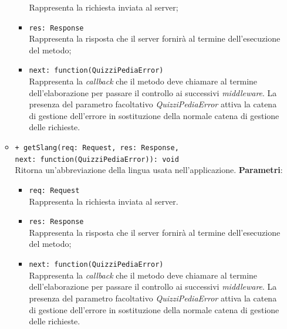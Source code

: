 \begin{itemize}
\begin{itemize}
\begin{itemize}
					Rappresenta la richiesta inviata al server;
					\item \texttt{res: Response} \\
					Rappresenta la risposta che il server fornirà al termine  dell'esecuzione del metodo;
					\item \texttt{next: function(QuizziPediaError)} \\
					Rappresenta la \textit{callback} che il metodo deve chiamare al termine dell'elaborazione per passare il controllo ai successivi \textit{middleware}. La presenza del parametro facoltativo \textit{QuizziPediaError} attiva la catena di gestione dell'errore in sostituzione della normale catena di gestione delle richieste.
				\end{itemize}
				\item \texttt{+ getSlang(req: Request, res: Response,\\ next: function(QuizziPediaError)): void} \\
				Ritorna un'abbreviazione della lingua usata nell'applicazione.
			\textbf{Parametri}:
				\begin{itemize}
					\item \texttt{req: Request} \\
					Rappresenta la richiesta inviata al server.
					\item \texttt{res: Response} \\
					Rappresenta la risposta che il server fornirà al termine  dell'esecuzione del metodo;
					\item \texttt{next: function(QuizziPediaError)} \\
					Rappresenta la \textit{callback} che il metodo deve chiamare al termine dell'elaborazione per passare il controllo ai successivi \textit{middleware}. La presenza del parametro facoltativo \textit{QuizziPediaError} attiva la catena di gestione dell'errore in sostituzione della normale catena di gestione delle richieste.
				\end{itemize}
		\end{itemize}
\end{itemize}

